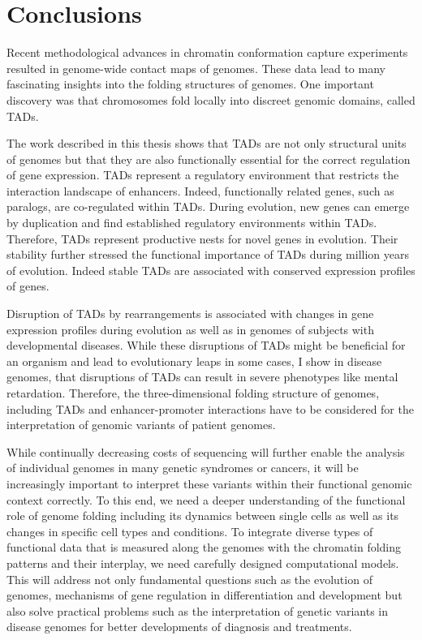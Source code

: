 \documentclass[a4paper,twoside=true,openright,parskip=full,chapterprefix=true,11pt,headings=normal,bibliography=totoc,listof=totoc,titlepage=on,captions=tableabove,draft=false]{scrreprt}
\theoremstyle{definition}
\theoremstyle{definition}
\theoremstyle{definition}
\theoremstyle{remark}
\begin{document}
\hypertarget{conclusions}{%
\section{Conclusions}\label{conclusions}}

Recent methodological advances in chromatin conformation capture
experiments resulted in genome-wide contact maps of genomes. These data
lead to many fascinating insights into the folding structures of
genomes. One important discovery was that chromosomes fold locally into
discreet genomic domains, called TADs.

The work described in this thesis shows that TADs are not only
structural units of genomes but that they are also functionally
essential for the correct regulation of gene expression. TADs represent
a regulatory environment that restricts the interaction landscape of
enhancers. Indeed, functionally related genes, such as paralogs, are
co-regulated within TADs. During evolution, new genes can emerge by
duplication and find established regulatory environments within TADs.
Therefore, TADs represent productive nests for novel genes in evolution.
Their stability further stressed the functional importance of TADs
during million years of evolution. Indeed stable TADs are associated
with conserved expression profiles of genes.

Disruption of TADs by rearrangements is associated with changes in gene
expression profiles during evolution as well as in genomes of subjects
with developmental diseases. While these disruptions of TADs might be
beneficial for an organism and lead to evolutionary leaps in some cases,
I show in disease genomes, that disruptions of TADs can result in severe
phenotypes like mental retardation. Therefore, the three-dimensional
folding structure of genomes, including TADs and enhancer-promoter
interactions have to be considered for the interpretation of genomic
variants of patient genomes.

While continually decreasing costs of sequencing will further enable the
analysis of individual genomes in many genetic syndromes or cancers, it
will be increasingly important to interpret these variants within their
functional genomic context correctly. To this end, we need a deeper
understanding of the functional role of genome folding including its
dynamics between single cells as well as its changes in specific cell
types and conditions. To integrate diverse types of functional data that
is measured along the genomes with the chromatin folding patterns and
their interplay, we need carefully designed computational models. This
will address not only fundamental questions such as the evolution of
genomes, mechanisms of gene regulation in differentiation and
development but also solve practical problems such as the interpretation
of genetic variants in disease genomes for better developments of
diagnosis and treatments.
\end{document}
